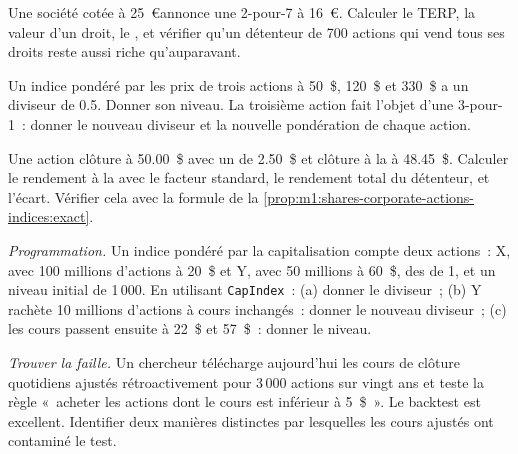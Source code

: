 \begin{exercise}[$\star\star$]\label{exo:m1:shares-corporate-actions-indices:4}
Une société cotée à 25~\euro annonce une  2-pour-7 à 16~\euro. Calculer
le TERP, la valeur d'un droit, le , et vérifier qu'un détenteur de
700 actions qui vend tous ses droits reste aussi riche qu'auparavant.
\end{exercise}

\begin{exercise}[$\star\star$]\label{exo:m1:shares-corporate-actions-indices:5}
Un indice pondéré par les prix de trois actions à 50~\$, 120~\$ et 330~\$ a un diviseur
de 0.5. Donner son niveau. La troisième action fait l'objet d'une  3-pour-1~: donner le nouveau diviseur
et la nouvelle pondération de chaque action.
\end{exercise}

\begin{exercise}[$\star\star$]\label{exo:m1:shares-corporate-actions-indices:6}
Une action clôture  à 50.00~\$ avec un  de 2.50~\$ et clôture à la
 à 48.45~\$. Calculer le rendement à la  avec le facteur standard, le
rendement total du détenteur, et l'écart. Vérifier cela avec la formule
de la \cref{prop:m1:shares-corporate-actions-indices:exact}.
\end{exercise}

\begin{exercise}[$\star\star\star$]\label{exo:m1:shares-corporate-actions-indices:7}
\emph{Programmation.} Un indice pondéré par la capitalisation compte deux actions~: X, avec 100
millions d'actions à 20~\$ et Y, avec 50 millions à 60~\$, des  de 1, et un
niveau initial de 1\,000. En utilisant \texttt{CapIndex}~: (a) donner le diviseur~; (b) Y
rachète 10 millions d'actions à cours inchangés~: donner le nouveau diviseur~; (c)
les cours passent ensuite à 22~\$ et 57~\$~: donner le niveau.
\end{exercise}

\begin{exercise}[$\star\star\star$]\label{exo:m1:shares-corporate-actions-indices:8}
\emph{Trouver la faille.} Un chercheur télécharge aujourd'hui les cours de clôture quotidiens ajustés rétroactivement
pour 3\,000 actions sur vingt ans et teste la règle «~acheter les actions
dont le cours est inférieur à 5~\$~». Le backtest est excellent. Identifier deux manières distinctes
par lesquelles les cours ajustés ont contaminé le test.
\end{exercise}

